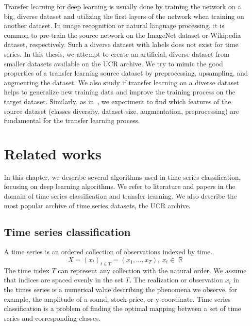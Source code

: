 \documentclass[a4paper,11pt,twoside]{report}
\theoremstyle{definition}
\DeclareMathOperator{\real}{\mathbb{R}}
\begin{document}
Transfer learning for deep learning is usually done by training the network on a big, diverse dataset and utilizing the first layers of the network when training on another dataset. In image recognition or natural language processing, it is common to pre-train the source network on the ImageNet dataset or Wikipedia dataset, respectively. Such a diverse dataset with labels does not exist for time series. In this thesis, we attempt to create an artificial, diverse dataset from smaller datasets available on the UCR archive. We try to mimic the good properties of a transfer learning source dataset by preprocessing, upsampling, and augmenting the dataset. We also study if transfer learning on a diverse dataset helps to generalize new training data and improve the training process on the target dataset. Similarly, as in~\cite{imagnet}, we experiment to find which features of the source dataset (classes diversity, dataset size, augmentation, preprocessing) are fundamental for the transfer learning process.

%
\chapter{Related works}
In this chapter, we describe several algorithms used in time series classification, focusing on deep learning algorithms. We refer to literature and papers in the domain of time series classification and transfer learning. We also describe the most popular archive of time series datasets, the UCR archive.


\section{Time series classification}
A time series is an ordered collection of observations indexed by time.
$$X = (x_t)_{t\in T} = (x_1, ... , x_T),\ x_t\in \real$$
The time index $T$ can represent any collection with the natural order. We assume that indices are spaced evenly in the set $T$. The realization or observation $x_t$ in the times series is a numerical value describing the phenomena we observe, for example, the amplitude of a sound, stock price, or y-coordinate. Time series classification is a problem of finding the optimal mapping between a set of time series and corresponding classes.
\end{document}
